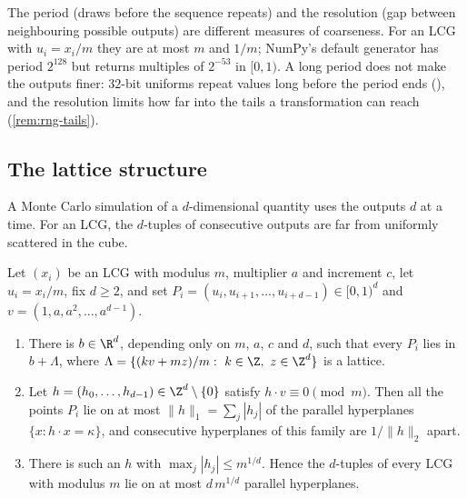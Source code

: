 \begin{remark}\label{rem:rng-resolution}
The period (draws before the sequence repeats) and the resolution (gap between
neighbouring possible outputs) are different measures of coarseness. For an LCG with
$u_i=x_i/m$ they are at most $m$ and $1/m$; NumPy's default generator has period $2^{128}$
but returns multiples of $2^{-53}$ in $[0,1)$. A long period does not make the outputs finer:
$32$-bit uniforms repeat values long before the period ends (), and
the resolution limits how far into the tails a transformation can reach
(\cref{rem:rng-tails}).
\end{remark}

\subsection{The lattice structure}\label{sec:rng-lattice}

A Monte Carlo simulation of a $d$-dimensional quantity uses the outputs $d$ at a time. For
an LCG, the $d$-tuples of consecutive outputs are far from uniformly scattered in the cube.

\begin{proposition}\label{prop:rng-lattice}
Let $(x_i)$ be an LCG with modulus $m$, multiplier $a$ and increment $c$, let $u_i=x_i/m$,
fix $d\ge2$, and set $P_i=(u_i,u_{i+1},\dots,u_{i+d-1})\in[0,1)^d$ and
$v=(1,a,a^2,\dots,a^{d-1})$.
\begin{enumerate}[label=(\roman*)]
  \item There is $b\in\R^d$, depending only on $m$, $a$, $c$ and $d$, such that every $P_i$
    lies in $b+\Lambda$, where $\Lambda=\{(kv+mz)/m:\ k\in\Z,\ z\in\Z^d\}$ is a lattice.
  \item Let $h=(h_0,\dots,h_{d-1})\in\Z^d\setminus\{0\}$ satisfy $h\cdot v\equiv0\pmod m$.
    Then all the points $P_i$ lie on at most $\|h\|_1=\sum_j|h_j|$ of the parallel
    hyperplanes $\{x:h\cdot x=\kappa\}$, and consecutive hyperplanes of this family are
    $1/\|h\|_2$ apart.
  \item There is such an $h$ with $\max_j|h_j|\le m^{1/d}$. Hence the $d$-tuples of
    every LCG with modulus $m$ lie on at most $d\,m^{1/d}$ parallel hyperplanes.
\end{enumerate}
\end{proposition}

